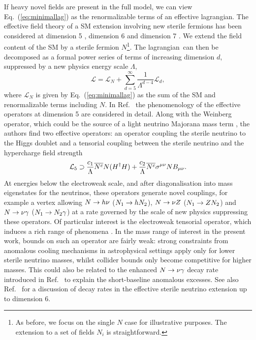 \documentclass[11pt, a4paper]{article}
\newcommand{\refeq}[1]{Eq.~(\ref{#1})}
\newcommand{\refref}[1]{Ref.~\cite{#1}}
\def\lagrangian{lagrangian}
\def\ster{\ensuremath N}
\begin{document}
If heavy novel fields are present in the full model, we can view
\refeq{eq:minimallag} as the renormalizable terms of an effective \lagrangian.
The effective field theory of a SM extension involving new sterile fermions has
been considered at dimension 5 \cite{delAguila:2008ir,Aparici:2009fh},
dimension 6 \cite{delAguila:2008ir} and dimension 7
\cite{Bhattacharya:2015vja}.
%
We extend the field content of the SM by a sterile fermion $N$\footnote{As
before, we focus on the single $N$ case for illustrative purposes. The
extension to a set of fields $N_i$ is straightforward.}.  The \lagrangian\ can
then be decomposed as a formal power series of terms of increasing dimension
$d$, suppressed by a new physics energy scale $\Lambda$,
%
\[  \mathcal{L} = \mathcal{L}_N + \sum_{d=5}^\infty
\frac{1}{\Lambda^{d-4}}\mathcal{L}_d, \]
%
where $\mathcal{L}_N$ is given by \refeq{eq:minimallag} as the sum of the SM
and renormalizable terms including $N$. In \refref{Aparici:2009fh} the
phenomenology of the effective operators at dimension 5 are considered in
detail. Along with the Weinberg operator, which could be the source of a light
neutrino Majorana mass term \cite{Weinberg:1979sa}, the authors find two
effective operators: an operator coupling the sterile neutrino to the Higgs
doublet and a tensorial coupling between the sterile neutrino and the
hypercharge field strength 
%
\[ \mathcal{L}_5 \supset \frac{c_1}{\Lambda}\overline{\ster^c}\ster(H^\dagger
H) + \frac{c_2}{\Lambda}\overline{\ster^c}\sigma^{\mu\nu}\ster B_{\mu\nu}. \] 
%
At energies below the electroweak scale, and after diagonalisation into mass
eigenstates for the neutrinos, these operators generate novel couplings, for
example a vertex allowing $\ster\to h \nu$ ($\ster_1\to h \ster_2$), $\ster\to
\nu Z$ ($\ster_1\to Z \ster_2$) and $\ster \to \nu \gamma$ ($\ster_1 \to
\ster_2 \gamma$) at a rate governed by the scale of new physics suppressing
these operators.
%
Of particular interest is the electroweak tensorial operator, which induces a
rich range of phenomena \cite{Aparici:2009fh}. In the mass range of interest in
the present work, bounds on such an operator are fairly weak: strong
constraints from anomalous cooling mechanisms in astrophysical settings apply
only for lower sterile neutrino masses, whilst collider bounds only become
competitive for higher masses. This could also be related to the enhanced
$\ster \to \nu\gamma$ decay rate introduced in
\refref{Gninenko:2009ks,Gninenko:2010pr} to explain the short-baseline
anomalous excesses.
%
See also \refref{Duarte:2016miz} for a discussion of decay rates in the
effective sterile neutrino extension up to dimension 6.
\end{document}
